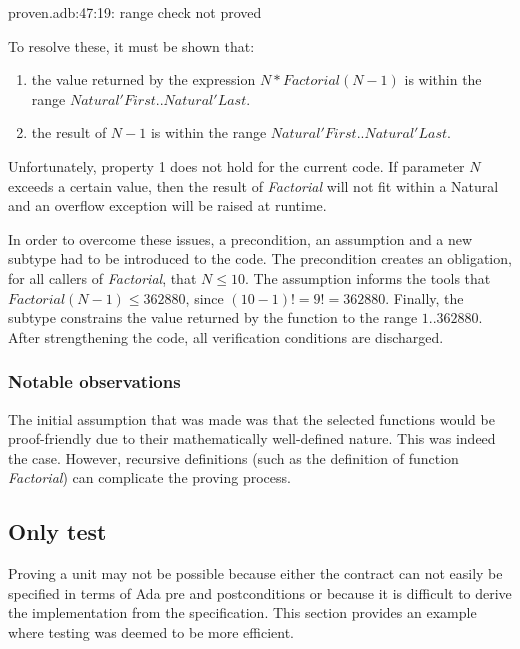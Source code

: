 \documentclass{llncs}
\begin{document}
proven.adb:47:19: range check not proved

\noindent
To resolve these, it must be shown that:
\begin{enumerate}
\item the value returned by the expression $N * Factorial (N - 1)$ is
  within the range $Natural'First .. Natural'Last$.
\item the result of $N - 1$ is within the range $Natural'First
  .. Natural'Last$.
\end{enumerate}
Unfortunately, property 1 does not hold for the current code. If
parameter $N$ exceeds a certain value, then the result of
\emph{Factorial} will not fit within a Natural and an overflow
exception will be raised at runtime.

In order to overcome these issues, a precondition, an assumption and a
new subtype had to be introduced to the code. The precondition creates
an obligation, for all callers of \emph{Factorial}, that $N \leq
10$. The assumption informs the tools that $Factorial (N - 1) \leq
362880$, since $(10 - 1)! = 9! = 362880$. Finally, the subtype
constrains the value returned by the function to the range $1
.. 362880$. After strengthening the code, all verification conditions
are discharged.




\subsubsection{Notable observations}
The initial assumption that was made was that the selected functions
would be proof-friendly due to their mathematically well-defined
nature. This was indeed the case. However, recursive definitions (such
as the definition of function \emph{Factorial}) can complicate the
proving process.


\subsection{Only test}
Proving a unit may not be possible because either the contract can not
easily be specified in terms of Ada pre and postconditions or because
it is difficult to derive the implementation from the specification.
This section provides an example where testing was deemed to be more
efficient.
\end{document}
